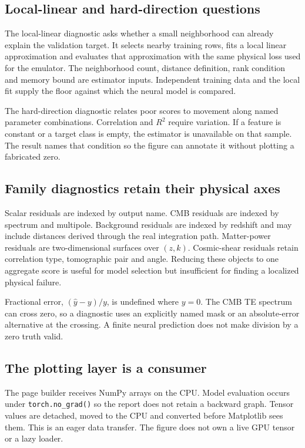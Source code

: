\documentclass[10pt,aps,prd,twocolumn,nofootinbib]{revtex4-2}
\newcommand{\code}[1]{\texttt{#1}}
\begin{document}
\subsection{Local-linear and hard-direction questions}

The local-linear diagnostic asks whether a small neighborhood can already
explain the validation target.  It selects nearby training rows, fits a local
linear approximation and evaluates that approximation with the same physical
loss used for the emulator.  The neighborhood count, distance definition,
rank condition and memory bound are estimator inputs.  Independent training
data and the local fit supply the floor against which the neural model is
compared.

The hard-direction diagnostic relates poor scores to movement along named
parameter combinations.  Correlation and \(R^2\) require variation.  If a
feature is constant or a target class is empty, the estimator is unavailable
on that sample.  The result names that condition so the figure can annotate it without
plotting a fabricated zero.

\subsection{Family diagnostics retain their physical axes}

Scalar residuals are indexed by output name.  CMB residuals are indexed by
spectrum and multipole.  Background residuals are indexed by redshift and may
include distances derived through the real integration path.  Matter-power
residuals are two-dimensional surfaces over \((z,k)\).  Cosmic-shear residuals
retain correlation type, tomographic pair and angle.  Reducing these objects
to one aggregate score is useful for model selection but insufficient for
finding a localized physical failure.

Fractional error, \((\widehat y-y)/y\), is undefined where \(y=0\).  The CMB
TE spectrum can cross zero, so a diagnostic uses an explicitly named mask or
an absolute-error alternative at the crossing.  A finite neural prediction
does not make division by a zero truth valid.

\subsection{The plotting layer is a consumer}

The page builder receives NumPy arrays on the CPU.  Model evaluation occurs
under \code{torch.no\_grad()} so the report does not retain a backward graph.
Tensor values are detached, moved to the CPU and converted before Matplotlib
sees them.  This is an eager data transfer.  The figure does not own a live GPU
tensor or a lazy loader.
\end{document}
